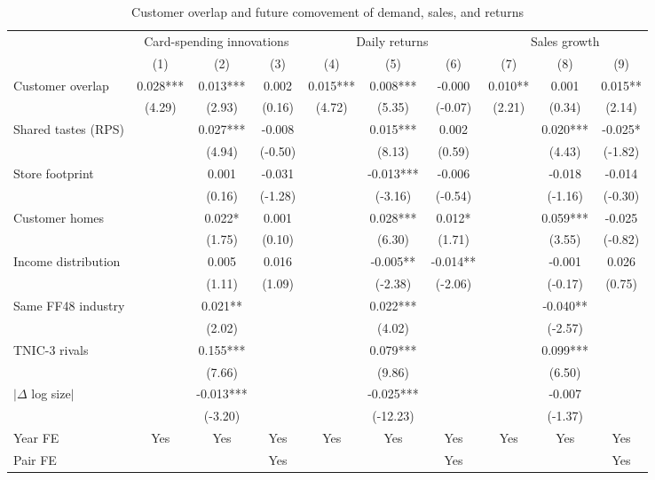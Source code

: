\begin{table}\centering
\caption{Customer overlap and future comovement of demand, sales, and returns}\label{tab:comove}
\scriptsize
\begin{tabular*}{\linewidth}{@{\extracolsep{\fill}}lccccccccc}
\toprule
 & \multicolumn{3}{c}{Card-spending innovations} & \multicolumn{3}{c}{Daily returns} & \multicolumn{3}{c}{Sales growth} \\
\cmidrule(lr){2-4}\cmidrule(lr){5-7}\cmidrule(lr){8-10}
 & (1) & (2) & (3) & (4) & (5) & (6) & (7) & (8) & (9) \\
\midrule
Customer overlap & 0.028*** & 0.013*** & 0.002 & 0.015*** & 0.008*** & -0.000 & 0.010** & 0.001 & 0.015** \\
 & (4.29) & (2.93) & (0.16) & (4.72) & (5.35) & (-0.07) & (2.21) & (0.34) & (2.14) \\
Shared tastes (RPS) &  & 0.027*** & -0.008 &  & 0.015*** & 0.002 &  & 0.020*** & -0.025* \\
 &  & (4.94) & (-0.50) &  & (8.13) & (0.59) &  & (4.43) & (-1.82) \\
Store footprint &  & 0.001 & -0.031 &  & -0.013*** & -0.006 &  & -0.018 & -0.014 \\
 &  & (0.16) & (-1.28) &  & (-3.16) & (-0.54) &  & (-1.16) & (-0.30) \\
Customer homes &  & 0.022* & 0.001 &  & 0.028*** & 0.012* &  & 0.059*** & -0.025 \\
 &  & (1.75) & (0.10) &  & (6.30) & (1.71) &  & (3.55) & (-0.82) \\
Income distribution &  & 0.005 & 0.016 &  & -0.005** & -0.014** &  & -0.001 & 0.026 \\
 &  & (1.11) & (1.09) &  & (-2.38) & (-2.06) &  & (-0.17) & (0.75) \\
Same FF48 industry &  & 0.021** &  &  & 0.022*** &  &  & -0.040** &  \\
 &  & (2.02) &  &  & (4.02) &  &  & (-2.57) &  \\
TNIC-3 rivals &  & 0.155*** &  &  & 0.079*** &  &  & 0.099*** &  \\
 &  & (7.66) &  &  & (9.86) &  &  & (6.50) &  \\
$|\Delta$ log size$|$ &  & -0.013*** &  &  & -0.025*** &  &  & -0.007 &  \\
 &  & (-3.20) &  &  & (-12.23) &  &  & (-1.37) &  \\
\addlinespace
Year FE & Yes & Yes & Yes & Yes & Yes & Yes & Yes & Yes & Yes \\
Pair FE &  &  & Yes &  &  & Yes &  &  & Yes \\

\end{tabular*}
\end{table}
